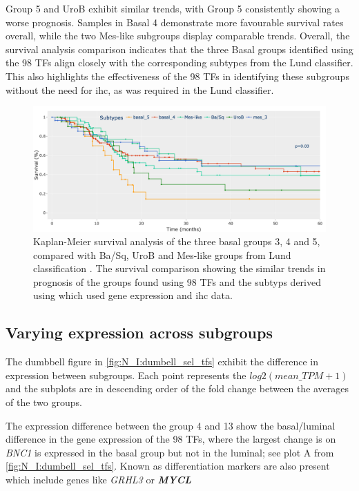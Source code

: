 Group 5 and UroB exhibit similar trends, with Group 5 consistently showing a worse prognosis. Samples in Basal 4 demonstrate more favourable survival rates overall, while the two Mes-like subgroups display comparable trends. Overall, the survival analysis comparison indicates that the three Basal groups identified using the 98 TFs align closely with the corresponding subtypes from the Lund classifier. This also highlights the effectiveness of the 98 TFs in identifying these subgroups without the need for \acrlong{ihc}, as was required in the Lund classifier.


\begin{figure}[!htb]
    \centering
    \includegraphics[width=1.0\textwidth,keepaspectratio]{Sections/Network_I/Resources/selective_pruning/comp_leiden_survival.png}
    \caption{Kaplan-Meier survival analysis of the three basal groups 3, 4 and 5, compared with Ba/Sq, UroB and Mes-like groups from Lund classification \citep{Marzouka2018-ge}. The survival comparison showing the similar trends in prognosis of the groups found using 98 TFs and the subtyps derived using \citet{Marzouka2018-ge} which used gene expression and \acrlong{ihc} data. }
    \label{fig:N_I:sel_tfs_comp_leiden}
\end{figure} 




\subsection{Varying expression across subgroups} \label{s:N_I:sel_tfs_ge}

The dumbbell figure in \cref{fig:N_I:dumbell_sel_tfs} exhibit the difference in expression between subgroups. Each point represents the $log2(mean\_TPM+1)$ and the subplots are in descending order of the fold change between the averages of the two groups.

The expression difference between the group 4 and 13 show the basal/luminal difference in the gene expression of the 98 TFs, where the largest change is on \textit{BNC1} is expressed in the basal group but not in the luminal; see plot A from \cref{fig:N_I:dumbell_sel_tfs}. Known as differentiation markers are also present which include genes like \textit{GRHL3} \citep{Ramal2024-ha} or \textbf{\textit{MYCL}} 

